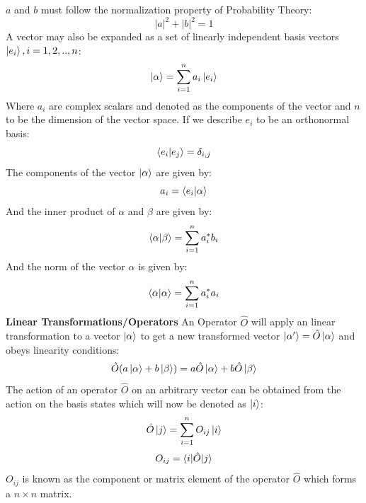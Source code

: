$a$ and $b$ must follow the normalization property of Probability Theory: 
\begin{equation}
    |a|^2 + |b|^2 = 1
\end{equation}
A vector may also be expanded as a set of linearly independent basis vectors $\ket{e_{i}}, i = 1,2,..,n$:
\begin{equation}
    \ket{\alpha} = \sum_{i=1}^{n} a_{i} \ket{e_{i}}
\end{equation}
Where $a_{i}$ are complex scalars and denoted as the components of the vector and $n$ to be the dimension of the vector space. 
If we describe $e_{i}$ to be an orthonormal basis:
\begin{equation}
    \braket{e_{i}|e_{j}} = \delta_{i,j}
\end{equation} 
The components of the vector $\ket{\alpha}$ are given by:
\begin{equation}
    a_{i} = \braket{e_{i}|\alpha}
\end{equation}
And the inner product of $\alpha$ and $\beta$ are given by:
\begin{equation}
    \braket{\alpha|\beta} = \sum_{i=1}^{n} a_{i}^{*}b_{i}
\end{equation}
And the norm of the vector $\alpha$ is given by:
\begin{equation}
    \braket{\alpha|\alpha} = \sum_{i=1}^{n} a_{i}^{*}a_{i}
\end{equation}
\textbf{Linear Transformations/Operators} \newline
An Operator $\hat{O}$ will apply an linear transformation to a vector $\ket{\alpha}$ to get a new transformed vector $\ket{\alpha'} = \hat{O}\ket{\alpha}$ and obeys linearity conditions:
\begin{equation}
    \hat{O}( a\ket{\alpha} + b \ket{\beta}) = a \hat{O}\ket{\alpha} + b \hat{O}\ket{\beta}
\end{equation}
The action of an operator $\hat{O}$ on an arbitrary vector can be obtained from the action on the basis states which will now be denoted as $\ket{i}$:
\begin{equation}
    \hat{O}\ket{j} = \sum_{i=1}^{n} O_{ij}\ket{i}
\end{equation}
\begin{equation}
    O_{ij} = \braket{i|\hat{O}|j}
\end{equation}
$O_{ij}$ is known as the component or matrix element of the operator $\hat{O}$ which forms a $n \times n$ matrix. \newline
